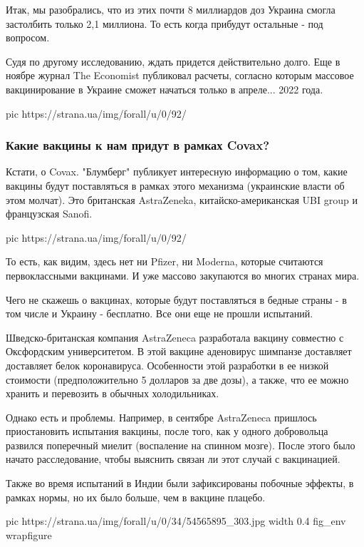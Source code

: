 Итак, мы разобрались, что из этих почти 8 миллиардов доз Украина смогла
застолбить только 2,1 миллиона. То есть когда прибудут остальные - под
вопросом.

Судя по другому исследованию, ждать придется действительно долго. Еще в ноябре
журнал The Economist публиковал расчеты, согласно которым массовое
вакцинирование в Украине сможет начаться только в апреле... 2022 года. 

\ifcmt
pic https://strana.ua/img/forall/u/0/92/%
\fi

\subsubsection{Какие вакцины к нам придут в рамках Covax?}

Кстати, о Covax. "Блумберг" публикует интересную информацию о том, какие
вакцины будут поставляться в рамках этого механизма (украинские власти об этом
молчат). Это британская AstraZeneka, китайско-американская UBI group и
французская Sanofi. 

\ifcmt
pic https://strana.ua/img/forall/u/0/92/%
\fi

То есть, как видим, здесь нет ни Pfizer, ни Moderna, которые считаются
первоклассными вакцинами. И уже массово закупаются во многих странах мира. 

Чего не скажешь о вакцинах, которые будут поставляться в бедные страны - в том
числе и Украину - бесплатно. Все они еще не прошли испытаний. 

Шведско-британская компания AstraZeneca разработала вакцину совместно с
Оксфордским университетом. В этой вакцине аденовирус шимпанзе доставляет
доставляет белок коронавируса. Особенности этой разработки в ее низкой
стоимости (предположительно 5 долларов за две дозы), а также, что ее можно
хранить и перевозить в обычных холодильниках. 

Однако есть и проблемы. Например, в сентябре AstraZeneca пришлось приостановить
испытания вакцины, после того, как у одного добровольца развился поперечный
миелит (воспаление на спинном мозге). После этого было начато расследование,
чтобы выяснить связан ли этот случай с вакцинацией.

Также во время испытаний в Индии были зафиксированы побочные эффекты, в рамках
нормы, но их было больше, чем в вакцине плацебо.


\ifcmt
pic https://strana.ua/img/forall/u/0/34/54565895_303.jpg
width 0.4
fig_env wrapfigure
\fi

